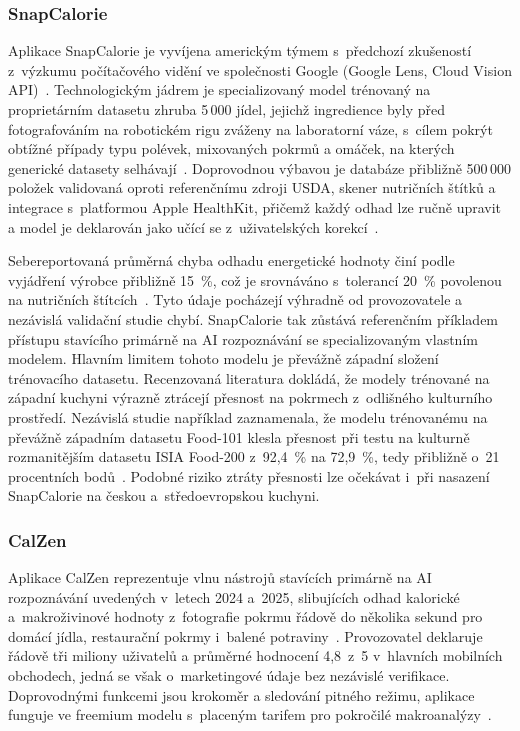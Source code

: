 \subsubsection{SnapCalorie}
\label{subsubsec:snapcalorie}

Aplikace SnapCalorie je vyvíjena americkým týmem s~předchozí zkušeností z~výzkumu počítačového vidění ve společnosti Google (Google Lens, Cloud Vision API)~\cite{snapcalorie2025}.
Technologickým jádrem je specializovaný model trénovaný na proprietárním datasetu zhruba 5\,000 jídel, jejichž ingredience byly před fotografováním na robotickém rigu zváženy na laboratorní váze, s~cílem pokrýt obtížné případy typu polévek, mixovaných pokrmů a omáček, na kterých generické datasety selhávají~\cite{snapcalorie2025,chotwanvirat2024scoping}.
Doprovodnou výbavou je databáze přibližně 500\,000 položek validovaná oproti referenčnímu zdroji USDA, skener nutričních štítků a integrace s~platformou Apple HealthKit, přičemž každý odhad lze ručně upravit a model je deklarován jako učící se z~uživatelských korekcí~\cite{snapcalorie2025}.

Sebereportovaná průměrná chyba odhadu energetické hodnoty činí podle vyjádření výrobce přibližně 15~\%, což je srovnáváno s~tolerancí 20~\% povolenou na nutričních štítcích~\cite{snapcalorie2025}.
Tyto údaje pocházejí výhradně od provozovatele a nezávislá validační studie chybí.
SnapCalorie tak zůstává referenčním příkladem přístupu stavícího primárně na AI rozpoznávání se specializovaným vlastním modelem.
Hlavním limitem tohoto modelu je převážně západní složení trénovacího datasetu.
Recenzovaná literatura dokládá, že modely trénované na západní kuchyni výrazně ztrácejí přesnost na pokrmech z~odlišného kulturního prostředí.
Nezávislá studie například zaznamenala, že modelu trénovanému na převážně západním datasetu Food-101 klesla přesnost při testu na kulturně rozmanitějším datasetu ISIA Food-200 z~92,4~\% na 72,9~\%, tedy přibližně o~21 procentních bodů~\cite{liu2025deepLearning}.
Podobné riziko ztráty přesnosti lze očekávat i~při nasazení SnapCalorie na českou a~středoevropskou kuchyni.

\subsubsection{CalZen}
\label{subsubsec:calzen}

Aplikace CalZen reprezentuje vlnu nástrojů stavících primárně na AI rozpoznávání uvedených v~letech 2024 a~2025, slibujících odhad kalorické a~makroživinové hodnoty z~fotografie pokrmu řádově do několika sekund pro domácí jídla, restaurační pokrmy i~balené potraviny~\cite{calzen2025}.
Provozovatel deklaruje řádově tři miliony uživatelů a průměrné hodnocení 4,8~z~5 v~hlavních mobilních obchodech, jedná se však o~marketingové údaje bez nezávislé verifikace.
Doprovodnými funkcemi jsou krokoměr a sledování pitného režimu, aplikace funguje ve freemium modelu s~placeným tarifem pro pokročilé makroanalýzy~\cite{calzen2025}.

